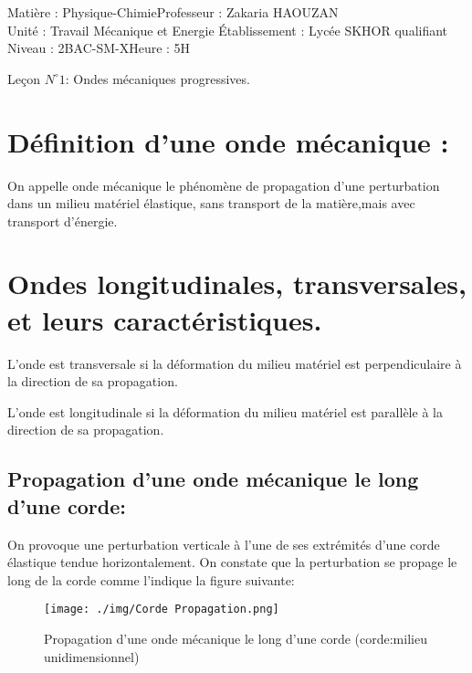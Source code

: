 \documentclass[12pt]{article}
\author{Zakaria HAOUZAN}
\date{\today}
\newcommand\headerMe[2]{\noindent{}#1\hfill#2}
\begin{document}
\headerMe{Matière : Physique-Chimie}{Professeur : Zakaria HAOUZAN}\\
\headerMe{Unité : Travail Mécanique et Energie }{Établissement : Lycée SKHOR qualifiant}\\
\headerMe{Niveau : 2BAC-SM-X}{Heure : 5H}\\

\begin{center}

    \Large{Leçon $N^{\circ} 1 $: \color{red}Ondes mécaniques progressives. }
\end{center}



\section{ Définition d’une onde mécanique : }

On appelle onde mécanique le phénomène de propagation d’une perturbation dans un milieu matériel élastique, sans transport de la matière,mais avec transport d'énergie.
\section{ Ondes longitudinales, transversales, et leurs caractéristiques. }

L'onde est transversale si la déformation du milieu matériel est perpendiculaire à la direction de sa propagation.

L'onde est longitudinale si la déformation du milieu matériel est parallèle à la direction de sa propagation.


\subsection{Propagation d'une onde mécanique le long d'une corde:}
On provoque une perturbation verticale à l'une de ses extrémités d'une corde élastique tendue horizontalement. On constate que la perturbation se propage le long de la corde comme l'indique la figure suivante:
\begin{wrapfigure}[4]{r}{0.5\textwidth}

	
	\texttt{[image: ./img/Corde Propagation.png]}
	\caption{Propagation d'une onde mécanique le long d'une corde (corde:milieu unidimensionnel)}
\end{wrapfigure}
\end{document}
